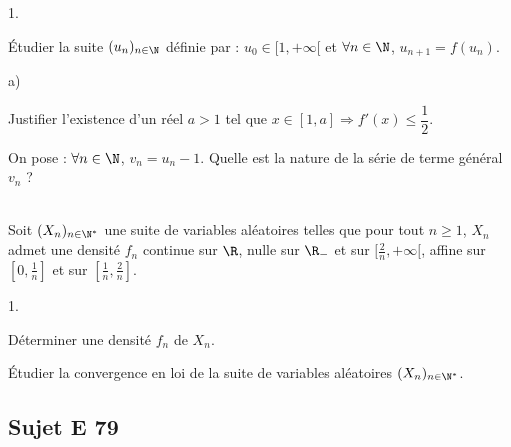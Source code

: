 \documentclass[11pt]{article}%
\begin{document}
\begin{exerciceAP}
\begin{noliste}{1.}
  \item Étudier la suite $(u_n)_{n\in\N}$ définie par :
    $u_0\in[1,+\infty[$ et $\forall n\in\N$, $u_{n+1}=f(u_n)$.

  \item
    \begin{noliste}{a)}
    \setlength{\itemsep}{2mm}
    \item Justifier l'existence d'un réel $a>1$ tel que $x\in[1,a]
      \Rightarrow f'(x)\leq \dfrac{1}{2}$.
    \item On pose : $\forall n\in\N$, $v_n=u_n-1$. Quelle est la
      nature de la série de terme général $v_n$ ?
    \end{noliste}
  \end{noliste}
\end{exerciceAP}





\begin{exerciceSP}~\\
  Soit $(X_n)_{n\in\N^*}$ une suite de variables aléatoires telles que
  pour tout $n\geq 1$, $X_n$ admet une densité $f_n$ continue sur
  $\R$, nulle sur $\R_-$ et sur $[\frac{2}{n}, +\infty [$, affine sur
  $[0, \frac{1}{n}]$ et sur $[ \frac{1}{n}, \frac{2}{n}]$.
  \begin{noliste}{1.}
    \setlength{\itemsep}{2mm}
  \item Déterminer une densité $f_n$ de $X_n$.
  \item Étudier la convergence en loi de la suite de variables
    aléatoires $(X_n)_{n\in\N^*}$.
  \end{noliste}
\end{exerciceSP}



\subsection*{Sujet E 79}

\end{document}
